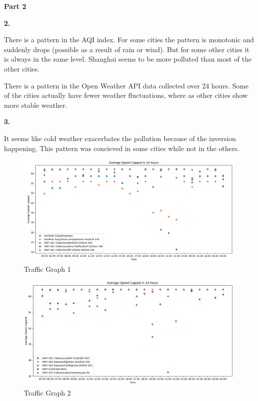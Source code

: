 \documentclass[12pt]{article}
\begin{document}
\vspace{5mm} 
\textbf{Part 2}

\vspace{2mm} 

\vspace{5mm} 
\textbf{2.}

\vspace{2mm} 

There is a pattern in the AQI index. For some cities the pattern is monotonic and suddenly drops (possible as a result of rain or wind). But for some other cities it is always in the same level. Shanghai seems to be more polluted than most of the other cities.

There is a pattern in the Open Weather API data collected over 24 hours. Some of the cities actually have fewer weather fluctuations, where as other cities show more stable weather.


\vspace{5mm} 
\textbf{3.}

\vspace{2mm} 

It seems like cold weather exacerbates the pollution because of the inversion happening. This pattern was concieved in some cities while not in the others.

\begin{figure}[h]
	\centering
	\includegraphics[scale=0.4]{traffic-graph-1}
	\caption{Traffic Graph 1}
\end{figure}

\begin{figure}[h]
	\centering
	\includegraphics[scale=0.4]{traffic-graph-2}
	\caption{Traffic Graph 2}
\end{figure}
\end{document}
